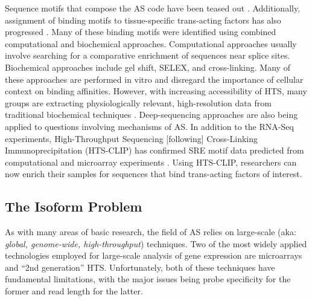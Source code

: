     Sequence motifs that compose the AS code have been teased out \citep{Ladd2002, Barash2010}. Additionally, assignment of binding motifs to tissue-specific trans-acting factors has also progressed \citep{Jin2003,Ule2005,Licatalosi2008}. Many of these binding motifs were identified using combined computational and biochemical approaches. Computational approaches usually involve searching for a comparative enrichment of sequences near splice sites. Biochemical approaches include gel shift, SELEX, and cross-linking. Many of these approaches are performed in vitro and disregard the importance of cellular context on binding affinities. However, with increasing accessibility of HTS, many groups are extracting physiologically relevant, high-resolution data from traditional biochemical techniques \citep{Ingolia2009, Ingolia2011}. Deep-sequencing approaches are also being applied to questions involving mechanisms of AS. In addition to the RNA-Seq experiments, High-Throughput Sequencing [following] Cross-Linking Immunoprecipitation (HTS-CLIP) has confirmed SRE motif data predicted from computational and microarray experiments \citep{Licatalosi2008,Hafner2010}. Using HTS-CLIP, researchers can now enrich their samples for sequences that bind trans-acting factors of interest. 


  \subsection{The Isoform Problem}\label{Intro:sec:Isoform Problem}

    As with many areas of basic research, the field of AS relies on large-scale (aka: \textit{global, genome-wide, high-throughput}) techniques. Two of the most widely applied technologies employed for large-scale analysis of gene expression are microarrays and ``2nd generation'' HTS. Unfortunately, both of these techniques have fundamental limitations, with the major issues being probe specificity for the former and read length for the latter.

